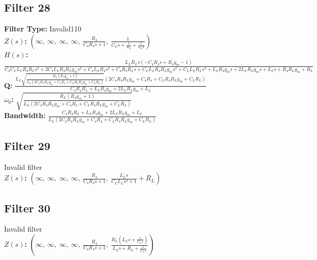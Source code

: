 \documentclass{article}
\begin{document}
\subsection*{Filter 28}
\textbf{Filter Type:} Invalid110 \\ 
\textbf{$Z(s)$:} $\left( \infty, \  \infty, \  \infty, \  \infty, \  \frac{R_{4}}{C_{4} R_{4} s + 1}, \  \frac{1}{C_{L} s + \frac{1}{R_{L}} + \frac{1}{L_{L} s}}\right)$ \\ 
\textbf{$H(s)$:} $\frac{L_{L} R_{L} s \left(- C_{4} R_{4} s + R_{4} g_{m} - 1\right)}{C_{4} C_{L} L_{L} R_{4} R_{L} s^{3} + 2 C_{4} L_{L} R_{4} R_{L} g_{m} s^{2} + C_{4} L_{L} R_{4} s^{2} + C_{4} R_{4} R_{L} s + C_{L} L_{L} R_{4} R_{L} g_{m} s^{2} + C_{L} L_{L} R_{L} s^{2} + L_{L} R_{4} g_{m} s + 2 L_{L} R_{L} g_{m} s + L_{L} s + R_{4} R_{L} g_{m} + R_{L}}$ \\ 
\textbf{Q:} $\frac{L_{L} \sqrt{\frac{R_{L} \left(R_{4} g_{m} + 1\right)}{L_{L} \left(2 C_{4} R_{4} R_{L} g_{m} + C_{4} R_{4} + C_{L} R_{4} R_{L} g_{m} + C_{L} R_{L}\right)}} \left(2 C_{4} R_{4} R_{L} g_{m} + C_{4} R_{4} + C_{L} R_{4} R_{L} g_{m} + C_{L} R_{L}\right)}{C_{4} R_{4} R_{L} + L_{L} R_{4} g_{m} + 2 L_{L} R_{L} g_{m} + L_{L}}$ \\ 
\textbf{$\omega_0$:} $\sqrt{\frac{R_{L} \left(R_{4} g_{m} + 1\right)}{L_{L} \left(2 C_{4} R_{4} R_{L} g_{m} + C_{4} R_{4} + C_{L} R_{4} R_{L} g_{m} + C_{L} R_{L}\right)}}$ \\ 
\textbf{Bandwidth:} $\frac{C_{4} R_{4} R_{L} + L_{L} R_{4} g_{m} + 2 L_{L} R_{L} g_{m} + L_{L}}{L_{L} \left(2 C_{4} R_{4} R_{L} g_{m} + C_{4} R_{4} + C_{L} R_{4} R_{L} g_{m} + C_{L} R_{L}\right)}$ \\ 
\subsection*{Filter 29}
Invalid filter \\ 
\textbf{$Z(s)$:} $\left( \infty, \  \infty, \  \infty, \  \infty, \  \frac{R_{4}}{C_{4} R_{4} s + 1}, \  \frac{L_{L} s}{C_{L} L_{L} s^{2} + 1} + R_{L}\right)$ \\ 
\subsection*{Filter 30}
Invalid filter \\ 
\textbf{$Z(s)$:} $\left( \infty, \  \infty, \  \infty, \  \infty, \  \frac{R_{4}}{C_{4} R_{4} s + 1}, \  \frac{R_{L} \left(L_{L} s + \frac{1}{C_{L} s}\right)}{L_{L} s + R_{L} + \frac{1}{C_{L} s}}\right)$ \\ 
\end{document}
